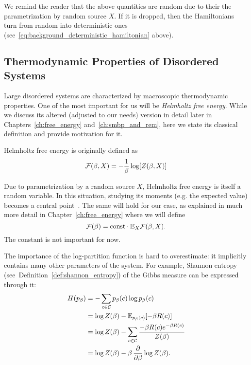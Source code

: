 \myremark We remind the reader that the above quantities are random due to their the
parametrization by random source $X$. If it is dropped, then the Hamiltonians
turn from random into deterministic ones
(see~\eqref{eq:background_deterministic_hamiltonian} above).

\subsection{Thermodynamic Properties of Disordered Systems}
Large disordered systems are characterized by macroscopic thermodynamic
properties. One of the most important for us will be \textit{Helmholtz free
energy}. While we discuss its altered (adjusted to our needs) version in detail
later in Chapters~\ref{ch:free_energy} and~\ref{ch:smbp_and_rem}, here we state
its classical definition and provide motivation for it.

\begin{definition}\label{def:background_free_energy}
  Helmholtz free energy is originally defined as
  \begin{equation}
    \mathcal{F}(\beta, X) = -\frac{1}{\beta}\log [Z(\beta, X)]
  \end{equation}
\end{definition}
Due to parametrization by a random source $X$, Helmholtz free energy is itself a
random variable. In this situation, studying its moments (e.g. the expected value) becomes a central
point~\citep[Chapter~9]{bovier2012statistical}. The same will hold for our case,
as explained in much more detail in Chapter~\ref{ch:free_energy} where we will define
\begin{equation}
  \mathcal{F}(\beta) = \mathrm{const} \cdot \mathbb{E}_X \mathcal{F}(\beta, X).
\end{equation}
The constant is not important for now.

The importance of the log-partition function is hard to overestimate: it
implicitly contains many other parameters of the system. For example, Shannon
entropy (see~Definition~\ref{def:shannon_entropy}) of the Gibbs measure can be
expressed through it:
\begin{align}
  H(p_\beta) &= -\sum_{c\in {\cal C}} p_\beta(c) \log p_\beta(c) \notag \\
    &= \log Z(\beta) - \mathbb{E}_{p_\beta(c)}[- \beta R(c)] \notag \\
    &= \log Z(\beta) - \sum_{c \in {\cal C}} \frac{- \beta R(c) e^{-\beta R(c)}}{Z(\beta)} \notag \\
    &= \log Z(\beta) - \beta \, \frac{\partial}{\partial \beta} \log Z(\beta).
\end{align}

